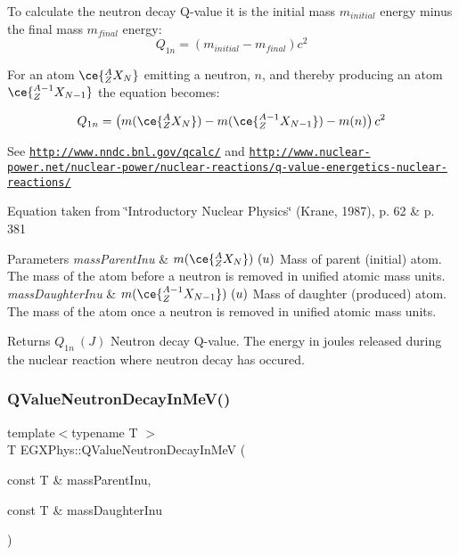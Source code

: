 To calculate the neutron decay Q-\/value it is the initial mass $m_{initial}$ energy minus the final mass $m_{final}$ energy\+: \[Q_{1n} = \left ( m_{initial}-m_{final}\right ) c^2\]

For an atom $\ce{ ^{A}_{Z}X_{N} }$ emitting a neutron, $n$, and thereby producing an atom $\ce{ ^{A-1}_{Z}X_{N-1} }$ the equation becomes\+:

\[Q_{1n} = \left ( m(\ce{ ^{A}_{Z}X_{N} }) - m(\ce{ ^{A-1}_{Z}X_{N-1} }) - m(n) \right ) c^2\]

See \href{http://www.nndc.bnl.gov/qcalc/}{\tt http\+://www.\+nndc.\+bnl.\+gov/qcalc/} and \href{http://www.nuclear-power.net/nuclear-power/nuclear-reactions/q-value-energetics-nuclear-reactions/}{\tt http\+://www.\+nuclear-\/power.\+net/nuclear-\/power/nuclear-\/reactions/q-\/value-\/energetics-\/nuclear-\/reactions/}

Equation taken from \char`\"{}\+Introductory Nuclear Physics\char`\"{} (Krane, 1987), p. 62 \& p. 381


\begin{DoxyParams}{Parameters}
{\em mass\+Parent\+Inu} & $m(\ce{ ^{A}_{Z}X_{N} })\ (u)$ Mass of parent (initial) atom. The mass of the atom before a neutron is removed in unified atomic mass units. \\
\hline
{\em mass\+Daughter\+Inu} & $m(\ce{ ^{A-1}_{Z}X_{N-1} })\ (u)$ Mass of daughter (produced) atom. The mass of the atom once a neutron is removed in unified atomic mass units. \\
\hline
\end{DoxyParams}
\begin{DoxyReturn}{Returns}
$Q_{1n}\ (J)$ Neutron decay Q-\/value. The energy in joules released during the nuclear reaction where neutron decay has occured. 
\end{DoxyReturn}
\mbox{\label{group___q_value_gaf854b3ac07909a87f44be4e38ebb0c32}} 
\subsubsection{\texorpdfstring{Q\+Value\+Neutron\+Decay\+In\+Me\+V()}{QValueNeutronDecayInMeV()}}
{\footnotesize\ttfamily template$<$typename T $>$ \\
T E\+G\+X\+Phys\+::\+Q\+Value\+Neutron\+Decay\+In\+MeV (\begin{DoxyParamCaption}\item[{const T \&}]{mass\+Parent\+Inu,  }\item[{const T \&}]{mass\+Daughter\+Inu }\end{DoxyParamCaption})}




